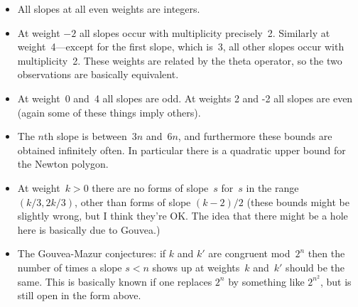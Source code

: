 \documentclass{article}
\begin{document}
\begin{itemize}
\item All slopes at all even weights are integers.

\item At weight $-2$ all slopes occur with multiplicity precisely~2. Similarly
at weight~4---except for the first slope, which is~3, all other
slopes occur with multiplicity~2. These weights are related by the theta
operator, so the two observations are basically equivalent.

\item At weight~0 and~4 all slopes are odd. At weights 2 and -2 all slopes
are even (again some of these things imply others).

\item The $n$th slope is between~$3n$ and~$6n$, and furthermore these
bounds are obtained infinitely often. In particular there is a
quadratic upper bound for the Newton polygon.

\item At weight~$k>0$ there are no forms of slope~$s$ for~$s$
in the range $(k/3,2k/3)$, other than forms of slope $(k-2)/2$
(these bounds might be slightly wrong, but I think they're OK.
The idea that there might be a hole here is basically due to Gouvea.)

\item The Gouvea-Mazur conjectures: if $k$ and $k'$ are congruent mod~$2^n$
then the number of times a slope $s<n$ shows up at weights~$k$ and~$k'$
should be the same. This is basically known if one replaces $2^n$
by something like $2^{n^2}$, but is still open in the form above.

\end{itemize}
\end{document}
